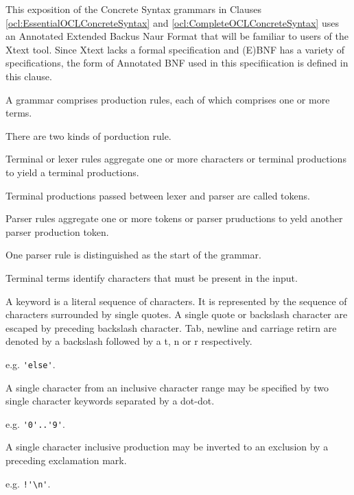 \label{ocl:AnnotatedEBNF}

This exposition of the Concrete Syntax grammars in Clauses \ref{ocl:EssentialOCLConcreteSyntax} and \ref{ocl:CompleteOCLConcreteSyntax} uses an Annotated Extended Backus Naur Format that will be familiar to users of the Xtext tool. Since Xtext lacks a formal specification and (E)BNF has a variety of specifications, the form of Annotated BNF used in this specifiication is defined in this clause.



A grammar comprises production rules, each of which comprises one or more terms.

There are two kinds of porduction rule.

Terminal or lexer rules aggregate one or more characters or terminal productions to yield a terminal productions.

Terminal productions passed between lexer and parser are called tokens.

Parser rules aggregate one or more tokens or parser pruductions to yeld another parser production token.

One parser rule is distinguished as the start of the grammar. 


Terminal terms identify characters that must be present in the input.


A keyword is a literal sequence of characters. It is represented by the sequence of characters surrounded by single quotes. A single quote or backslash character are escaped by preceding backslash character. Tab, newline and carriage retirn are denoted by a backslash followed by a t, n or r respectively.

e.g. \verb|'else'|.


A single character from an inclusive character range may be specified by two single character keywords separated by a dot-dot.

e.g. \verb|'0'..'9'|.


A single character inclusive production may be inverted to an exclusion by a preceding exclamation mark.

e.g. \verb|!'\n'|.


